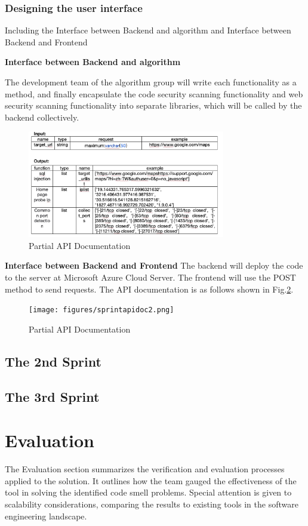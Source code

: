 \documentclass[journal]{IEEEtran}
\begin{document}
\subsubsection{Designing the user interface} Including the Interface between Backend and algorithm and Interface between Backend and Frontend

\textbf{Interface between Backend and algorithm}

The development team of the algorithm group will write each functionality as a method, and finally encapsulate the code security scanning functionality and web security scanning functionality into separate libraries, which will be called by the backend collectively.

\begin{figure}[h]
  \centering
  \includegraphics[width=3.4in]{figures/sprintapidoc1.png}
  \caption{Partial API Documentation}
  \label{fig:sprintapidoc1}
  \end{figure}

\textbf{Interface between Backend and Frontend}
The backend will deploy the code to the server at Microsoft Azure Cloud Server. The frontend will use the POST method to send requests. The API documentation is as follows shown in Fig.\ref{fig:sprintapidoc2}.
\begin{figure}[h]
  \centering
  \texttt{[image: figures/sprintapidoc2.png]}
  \caption{Partial API Documentation}
  \label{fig:sprintapidoc2}
  \end{figure}

\subsection{The 2nd Sprint}

\subsection{The 3rd Sprint}


\section{Evaluation}
\noindent The Evaluation section summarizes the verification and evaluation processes applied to the solution. It outlines how the team gauged the effectiveness of the tool in solving the identified code smell problems. Special attention is given to scalability considerations, comparing the results to existing tools in the software engineering landscape.
\end{document}
